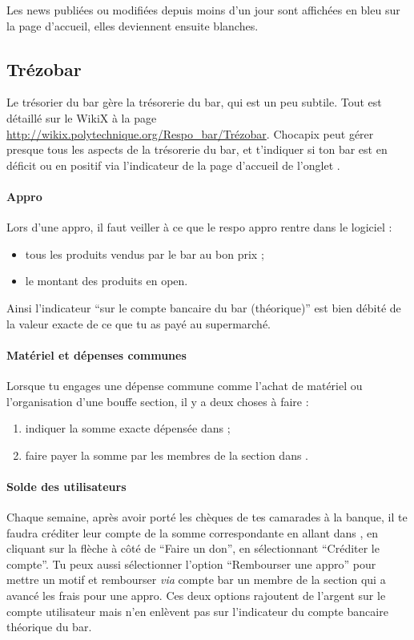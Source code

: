 \documentclass[12pt,french]{article}
\begin{document}
Les news publiées ou modifiées depuis moins d'un jour sont affichées en bleu sur la page d'accueil, elles deviennent ensuite blanches.

\subsection{Trézobar}

Le trésorier du bar gère la trésorerie du bar, qui est un peu subtile. Tout est détaillé sur le WikiX à la page \url{http://wikix.polytechnique.org/Respo_bar/Trézobar}. Chocapix peut gérer presque tous les aspects de la trésorerie du bar, et t'indiquer si ton bar est en déficit ou en positif via l'indicateur de la page d'accueil de l'onglet .

\paragraph{Appro} Lors d'une appro, il faut veiller à ce que le respo appro rentre dans le logiciel :
\begin{itemize}
	\item tous les produits vendus par le bar au bon prix ;
	\item le montant des produits en open.
\end{itemize}
Ainsi l'indicateur \enquote{sur le compte bancaire du bar (théorique)}  est bien débité de la valeur exacte de ce que tu as payé au supermarché.

\paragraph{Matériel et dépenses communes} Lorsque tu engages une dépense commune comme l'achat de matériel ou l'organisation d'une bouffe section, il y a deux choses à faire :
\begin{enumerate}
	\item indiquer la somme exacte dépensée dans  ;%
	\item faire payer la somme par les membres de la section dans .
\end{enumerate}

\paragraph{Solde des utilisateurs} Chaque semaine, après avoir porté les chèques de tes camarades à la banque, il te faudra créditer leur compte de la somme correspondante en allant dans , en cliquant sur la flèche à côté de \enquote{Faire un don}, en sélectionnant \enquote{Créditer le compte}. Tu peux aussi sélectionner l'option \enquote{Rembourser une appro} pour mettre un motif et rembourser \emph{via} compte bar un membre de la section qui a avancé les frais pour une appro. Ces deux options rajoutent de l'argent sur le compte utilisateur mais n'en enlèvent pas sur l'indicateur du compte bancaire théorique du bar.
\end{document}
